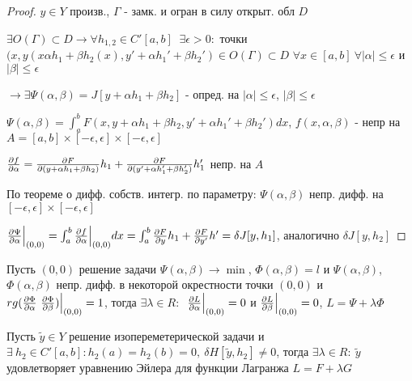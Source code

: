\documentclass{article}
\begin{document}
\begin{proof}
  $y \in Y$ произв., $\Gamma$ - замк. и огран в силу открыт. обл $D$

  $\exists O(\Gamma) \subset D \rightarrow \forall h_{1,2} \in C'[a,b] \ $
  $\exists \epsilon > 0: $ точки $(x, y(x\alpha h_1 + \beta h_2(x), y'+\alpha h_1' + \beta h_2') \in O(\Gamma) \subset D$ 
  $\forall x \in [a,b] \ \forall |\alpha| \le \epsilon$ и $|\beta| \le \epsilon$

  $\rightarrow \exists \Psi(\alpha,\beta)=J[y+\alpha h_1 + \beta h_2]$ - опред. на $|\alpha| \le \epsilon$, $|\beta| \le \epsilon$ 

  $\Psi(\alpha,\beta)=\int_{a}^{b}F(x, y+\alpha h_1 + \beta h_2, y' + \alpha h_1' + \beta h_2')dx$,
  $f(x, \alpha, \beta)$ - непр на $A = [a,b] \times [-\epsilon, \epsilon] \times [-\epsilon, \epsilon]$

  $\frac{\partial{f}}{\partial{\alpha}}=\frac{\partial{F}}{\partial{(y+\alpha h_1 + \beta h_2)}}h_1 + \frac{\partial{F}}{\partial{(y'+\alpha h_1' + \beta h_2')}}h_1'$ непр. на $A$

  По теореме о дифф. собств. интегр. по параметру: $\Psi(\alpha, \beta)$ непр. дифф. на $[-\epsilon,\epsilon] \times [-\epsilon,\epsilon]$

  $\frac{\partial{\Psi}}{\partial{\alpha}}\Big|_{(0,0)}=\int_{a}^{b}\frac{\partial{f}}{\partial{\alpha}}\Big|_{(0,0)}dx= \int_{a}^{b}\frac{\partial{F}}{\partial{y}}h_1 + \frac{\partial{F}}{\partial{y'}}h'=\delta J[y,h_1]$, аналогично $\delta J[y,h_2]$
\end{proof}
\begin{theorem}
  Пусть $(0,0)$ решение задачи $\Psi(\alpha,\beta) \to \min$, $\Phi(\alpha,\beta)=l$
  и $\Psi(\alpha,\beta)$, $\Phi(\alpha,\beta)$ непр. дифф. в некоторой окрестности точки $(0,0)$
  и $rg(\pd{\Phi}{\alpha} \ \pd{\Phi}{\beta})\Big|_{(0,0)}=1$,
  тогда $\exists \lambda \in R: \:$ $\frac{\partial{L}}{\partial{\alpha}}\Big|_{(0,0)}=0$ и 
  $\frac{\partial{L}}{\partial{\beta}}\Big|_{(0,0)}=0$, $L=\Psi+\lambda \Phi$
\end{theorem}
\begin{theorem}
  Пусть $\tilde{y}\in Y$ решение изопереметерической задачи и
  $\exists \ h_2 \in C'[a,b] : h_2(a)=h_2(b)=0, \ \delta H[\tilde{y},h_2] \neq 0$,
  тогда $\exists \lambda \in R: \: \tilde{y}$ удовлетворяет уравнению Эйлера для 
  функции Лагранжа $L=F+\lambda G$
\end{theorem}
\end{document}
